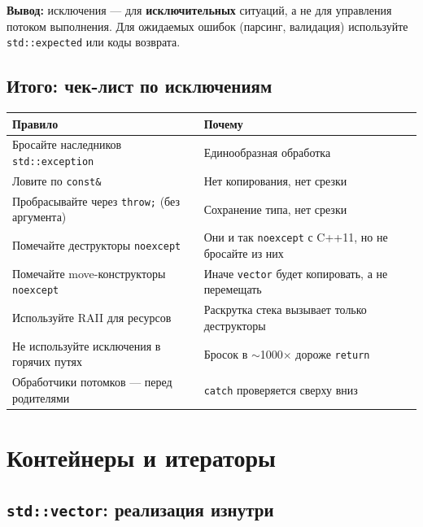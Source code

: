 \documentclass[a4paper,12pt]{article}
\begin{document}
\textbf{Вывод:} исключения --- для \textbf{исключительных} ситуаций,
а не для управления потоком выполнения. Для ожидаемых ошибок (парсинг,
валидация) используйте \texttt{std::expected} или коды возврата.

\subsection{Итого: чек-лист по исключениям}

\begin{center}
\begin{tabular}{lp{9cm}}
\toprule
\textbf{Правило} & \textbf{Почему} \\
\midrule
Бросайте наследников \texttt{std::exception}
    & Единообразная обработка \\
\addlinespace
Ловите по \texttt{const\&}
    & Нет копирования, нет срезки \\
\addlinespace
Пробрасывайте через \texttt{throw;} (без аргумента)
    & Сохранение типа, нет срезки \\
\addlinespace
Помечайте деструкторы \texttt{noexcept}
    & Они и так \texttt{noexcept} с C++11, но не бросайте из них \\
\addlinespace
Помечайте move-конструкторы \texttt{noexcept}
    & Иначе \texttt{vector} будет копировать, а не перемещать \\
\addlinespace
Используйте RAII для ресурсов
    & Раскрутка стека вызывает только деструкторы \\
\addlinespace
Не используйте исключения в горячих путях
    & Бросок в $\sim$1000$\times$ дороже \texttt{return} \\
\addlinespace
Обработчики потомков --- перед родителями
    & \texttt{catch} проверяется сверху вниз \\
\bottomrule
\end{tabular}
\end{center}

\newpage
\section{Контейнеры и итераторы}

\subsection{\texttt{std::vector}: реализация изнутри}
\end{document}
